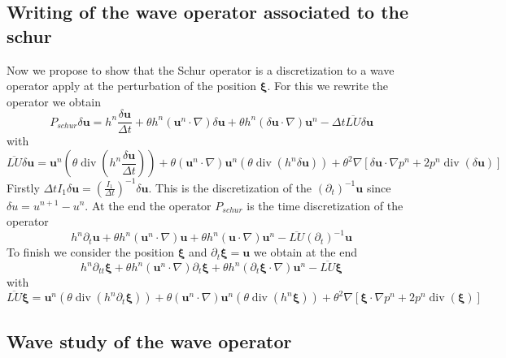 \documentclass[a4paper, 11pt]{article}
\begin{document}
\subsection{Writing of the wave operator associated to the schur}
Now we propose to show that the Schur operator is a discretization to a wave operator apply at the perturbation of the position $\boldsymbol{\xi} $.
For this we rewrite the operator we obtain
$$
P_{schur}\delta \boldsymbol{u}= h^n\frac{\delta \boldsymbol{u}}{\Delta t}+\theta h^n\left(\boldsymbol{u}^n\cdot\nabla\right)\delta \boldsymbol{u}+\theta h^n\left(\delta \boldsymbol{u} \cdot\nabla\right)\boldsymbol{u}^n-\Delta t \overline{LU}\delta \boldsymbol{u}
$$
with
$$
\overline{LU}\delta \boldsymbol{u}=\boldsymbol{u}^n\left(\theta \operatorname{div}(h^n\frac{ \delta \boldsymbol{u}}{\Delta t})\right)+\theta \left(\boldsymbol{u}^n\cdot \nabla \right)\boldsymbol{u}^n \left(\theta \operatorname{div}(h^n \delta \boldsymbol{u})\right)
+\theta^2 \nabla\left[ \delta \boldsymbol{u}\cdot \nabla p^n + 2p^n \operatorname{div}(\delta \boldsymbol{u}) \right]
$$
Firstly $\Delta t I_1 \delta  \boldsymbol{u}=(\frac{I_1}{\Delta t})^{-1} \delta \boldsymbol{u}$.  This is the discretization of the $(\partial_t )^{-1} \boldsymbol{u}$ since $\delta u=u^{n+1}-u^n$. At the end the operator $P_{schur}$ is the time discretization of the operator
$$
h^n\partial_t \boldsymbol{u}+\theta h^n\left(\boldsymbol{u}^n\cdot\nabla\right) \boldsymbol{u}+\theta h^n\left( \boldsymbol{u} \cdot\nabla\right)\boldsymbol{u}^n- \overline{LU} (\partial_t )^{-1}  \boldsymbol{u}
$$
To finish we consider the position $\boldsymbol{\xi} $ and $\partial_t \boldsymbol{\xi} = \boldsymbol{u}$ we obtain at the end
$$
h^n\partial_{tt} \boldsymbol{\xi}+\theta h^n\left(\boldsymbol{u}^n\cdot\nabla\right) \partial_t\boldsymbol{\xi}+\theta h^n\left( \partial_t \boldsymbol{\xi} \cdot\nabla\right)\boldsymbol{u}^n- \overline{LU}  \boldsymbol{\xi}
$$
with
$$
\overline{LU} \boldsymbol{\xi}=\boldsymbol{u}^n\left(\theta \operatorname{div}(h^n \partial_t\boldsymbol{\xi})\right)+\theta \left(\boldsymbol{u}^n\cdot \nabla\right) \boldsymbol{u}^n \left(\theta \operatorname{div}(h^n \boldsymbol{\xi})\right)
+\theta^2 \nabla\left[ \boldsymbol{\xi}\cdot \nabla p^n + 2p^n \operatorname{div}( \boldsymbol{\xi}) \right]
$$

\subsection{Wave study of the wave operator }
\end{document}
